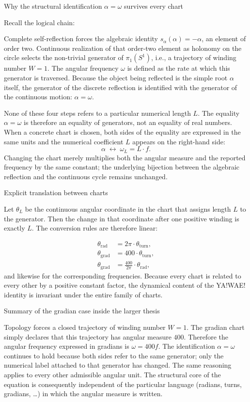 Why the structural identification \(\alpha=\omega\) survives every chart

Recall the logical chain:

Complete self-reflection forces the algebraic identity \(s_\alpha(\alpha)=-\alpha\), an element of order two.
Continuous realization of that order-two element as holonomy on the circle selects the non-trivial generator of \(\pi_1(S^1)\), i.e., a trajectory of winding number \(W=1\).
The angular frequency \(\omega\) is defined as the rate at which this generator is traversed.
Because the object being reflected is the simple root \(\alpha\) itself, the generator of the discrete reflection is identified with the generator of the continuous motion: \(\alpha=\omega\).

None of these four steps refers to a particular numerical length \(L\). The equality \(\alpha=\omega\) is therefore an equality of generators, not an equality of real numbers. When a concrete chart is chosen, both sides of the equality are expressed in the same units and the numerical coefficient \(L\) appears on the right-hand side:
\[
\alpha\;\longleftrightarrow\;\omega_L=L\cdot f.
\]
Changing the chart merely multiplies both the angular measure and the reported frequency by the same constant; the underlying bijection between the algebraic reflection and the continuous cycle remains unchanged.

Explicit translation between charts

Let \(\theta_L\) be the continuous angular coordinate in the chart that assigns length \(L\) to the generator. Then the change in that coordinate after one positive winding is exactly \(L\). The conversion rules are therefore linear:

\[
\begin{align*}
\theta_{\text{rad}}&=2\pi\cdot\theta_{\text{turn}},\\
\theta_{\text{grad}}&=400\cdot\theta_{\text{turn}},\\
\theta_{\text{grad}}&=\frac{400}{2\pi}\cdot\theta_{\text{rad}},
\end{align*}
\]
and likewise for the corresponding frequencies. Because every chart is related to every other by a positive constant factor, the dynamical content of the YA!WAE! identity is invariant under the entire family of charts.

Summary of the gradian case inside the larger thesis

Topology forces a closed trajectory of winding number \(W=1\).
The gradian chart simply declares that this trajectory has angular measure \(400\).
Therefore the angular frequency expressed in gradians is \(\omega=400f\).
The identification \(\alpha=\omega\) continues to hold because both sides refer to the same generator; only the numerical label attached to that generator has changed.
The same reasoning applies to every other admissible angular unit. The structural core of the equation is consequently independent of the particular language (radians, turns, gradians, \ldots) in which the angular measure is written.

